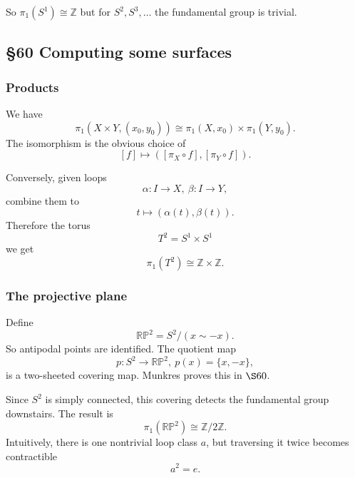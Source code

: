\documentclass[11pt]{article}
\begin{document}
So $\pi_1(S^1) \cong \mathbb Z$ but 
for $S^2,S^3,\ldots$ the fundamental group is trivial. 

\subsection{\S60 Computing some surfaces}

\subsubsection{Products}

We have 
\[
    \pi_1(X\times Y, (x_0,y_0)) 
    \cong \pi_1(X, x_0) \times \pi_1(Y,y_0). 
\]
The isomorphism is the obvious choice of 
\[
    [f] \mapsto ([\pi_X \circ f], [\pi_Y \circ f]).
\]

Conversely, given loops 
\[
    \alpha : I \to X, \ \beta : I \to Y, 
\]
combine them to 
\[
    t \mapsto (\alpha(t), \beta(t)). 
\]
Therefore the torus 
\[
    T^2 = S^1 \times S^1 
\]
we get 
\[
    \pi_1(T^2) \cong \mathbb Z \times \mathbb Z. 
\]

\subsubsection{The projective plane}

Define 
\[
    \mathbb R \mathbb P^2 
    = S^2/(x \sim -x). 
\]
So antipodal points are identified. 
The quotient map 
\[
    p : S^2 \to \mathbb R \mathbb P^2, \ p(x) = \{x,-x\}, 
\]
is a two-sheeted covering map. Munkres proves this in 
$\S60$. 

Since $S^2$ is simply connected, this covering detects 
the fundamental group downstairs. The result is 
\[
    \pi_1(\mathbb R\mathbb P^2) 
    \cong \mathbb Z/2\mathbb Z. 
\]
Intuitively, there is one nontrivial loop 
class $a$, but traversing it twice becomes 
contractible 
\[
    a^2 = e. 
\]
\end{document}
